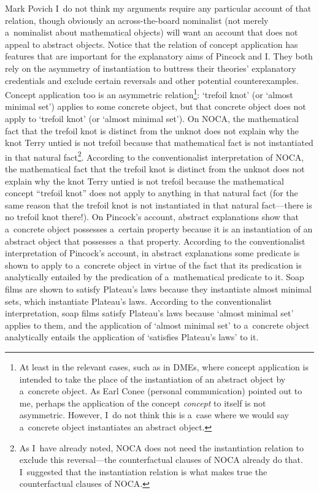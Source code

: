 \begin{artengenv}{Mark Povich}
{ I~do not think my arguments require any particular account of that relation, though obviously an across-the-board nominalist (not merely a~nominalist about mathematical objects) will want an account that does not appeal to abstract objects.} Notice that the relation of concept application has features that are important for the explanatory aims of Pincock and I. They both rely on the asymmetry of instantiation to buttress their theories' explanatory credentials and exclude certain reversals and other potential counterexamples. Concept application too is an asymmetric relation\footnote{At least in the relevant cases, such as in DMEs, where concept application is intended to take the place of the instantiation of an abstract object by a~concrete object. As Earl Conee (personal communication) pointed out to me, perhaps the application of the concept \textit{concept} to itself is not asymmetric. However, I~do not think this is a~case where we would say a~concrete object instantiates an abstract object.}: ‘trefoil knot' (or ‘almost minimal set') applies to some concrete object, but that concrete object does not apply to ‘trefoil knot' (or ‘almost minimal set'). On NOCA, the mathematical fact that the trefoil knot is distinct from the unknot does not explain why the knot Terry untied is not trefoil because that mathematical fact is not instantiated in that natural fact\footnote{As I~have already noted, NOCA does not need the instantiation relation to exclude this reversal---the counterfactual clauses of NOCA already do that. I~suggested that the instantiation relation is what makes true the counterfactual clauses of NOCA.}. According to the conventionalist interpretation of NOCA, the mathematical fact that the trefoil knot is distinct from the unknot does not explain why the knot Terry untied is not trefoil because the mathematical concept ``trefoil knot'' does not apply to anything in that natural fact (for the same reason that the trefoil knot is not instantiated in that natural fact---there is no trefoil knot there!). On Pincock's account, abstract explanations show that a~concrete object possesses a~certain property because it is an instantiation of an abstract object that possesses a~that property. According to the conventionalist interpretation of Pincock's account, in abstract explanations some predicate is shown to apply to a~concrete object in virtue of the fact that its predication is analytically entailed by the predication of a~mathematical predicate to it. Soap films are shown to satisfy Plateau's laws because they instantiate almost minimal sets, which instantiate Plateau's laws. According to the conventionalist interpretation, soap films satisfy Plateau's laws because ‘almost minimal set' applies to them, and the application of ‘almost minimal set' to a~concrete object analytically entails the application of ‘satisfies Plateau's laws' to it.


\end{artengenv}

